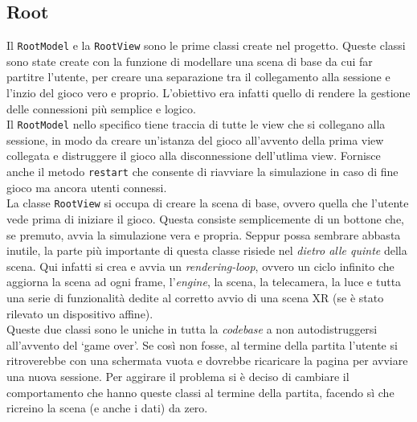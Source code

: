 \subsection{Root}\label{subsec:root}
Il \texttt{RootModel} e la \texttt{RootView} sono le prime classi create nel progetto. Queste classi sono state create con la funzione di modellare una scena di base da cui far
partitre l'utente, per creare una separazione tra il collegamento alla sessione e l'inzio del gioco vero e proprio. L'obiettivo era infatti quello di rendere la gestione delle
connessioni più semplice e logico.\\
Il \texttt{RootModel} nello specifico tiene traccia di tutte le view che si collegano alla sessione, in modo da creare un'istanza del gioco all'avvento della prima view collegata e 
distruggere il gioco alla disconnessione dell'utlima view. Fornisce anche il metodo \texttt{restart} che consente di riavviare la simulazione in caso di fine gioco ma ancora utenti 
connessi.\\
La classe \texttt{RootView} si occupa di creare la scena di base, ovvero quella che l'utente vede prima di iniziare il gioco. Questa consiste semplicemente di un bottone che, se 
premuto, avvia la simulazione vera e propria. Seppur possa sembrare abbasta inutile, la parte più importante di questa classe risiede nel \textit{dietro alle quinte} della scena. 
Qui infatti si crea e avvia un \textit{rendering-loop}, ovvero un ciclo infinito che aggiorna la scena ad ogni frame, l'\textit{engine}, la scena, la telecamera, la luce e tutta
una serie di funzionalità dedite al corretto avvio di una scena XR (se è stato rilevato un dispositivo affine).\\
Queste due classi sono le uniche in tutta la \textit{codebase} a non autodistruggersi all'avvento del `game over'. Se così non fosse, al termine della partita l'utente si ritroverebbe
con una schermata vuota e dovrebbe ricaricare la pagina per avviare una nuova sessione. Per aggirare il problema si è deciso di cambiare il comportamento che hanno queste classi al 
termine della partita, facendo sì che ricreino la scena (e anche i dati) da zero.\\

